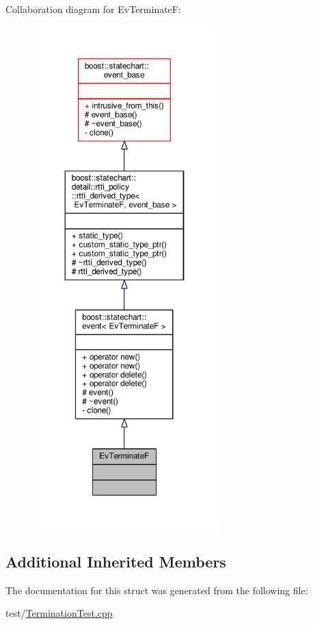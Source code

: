 Collaboration diagram for Ev\+TerminateF\+:
\nopagebreak
\begin{figure}[H]
\begin{center}
\leavevmode
\includegraphics[height=550pt]{struct_ev_terminate_f__coll__graph}
\end{center}
\end{figure}
\subsection*{Additional Inherited Members}


The documentation for this struct was generated from the following file\+:\begin{DoxyCompactItemize}
\item 
test/\mbox{\hyperlink{_termination_test_8cpp}{Termination\+Test.\+cpp}}\end{DoxyCompactItemize}
